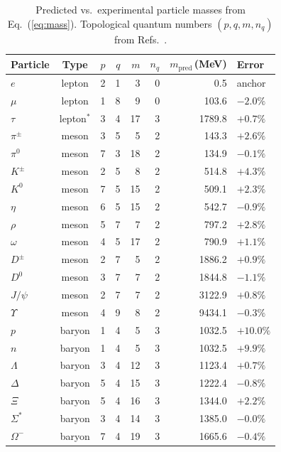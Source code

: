 \documentclass[11pt]{article}
\begin{document}
\begin{table}[t]
\centering
\caption{Predicted vs.\ experimental particle masses from Eq.~(\ref{eq:mass}).
Topological quantum numbers $(p,q,m,n_q)$ from Refs.~\cite{NWT1,NWT6}.}
\label{tab:spectrum}
\smallskip
\begin{tabular}{lcrrrrrl}
\toprule
Particle & Type & $p$ & $q$ & $m$ & $n_q$
    & $m_\mathrm{pred}$\,(MeV) & Error \\
\midrule
$e$            & lepton & 2 & 1 &  3 & 0 &     0.5 & anchor \\
$\mu$          & lepton & 1 & 8 &  9 & 0 &   103.6 & $-2.0\%$ \\
$\tau$         & lepton$^*$ & 3 & 4 & 17 & 3 &  1789.8 & $+0.7\%$ \\
\midrule
$\pi^{\pm}$    & meson  & 3 & 5 &  5 & 2 &   143.3 & $+2.6\%$ \\
$\pi^0$        & meson  & 7 & 3 & 18 & 2 &   134.9 & $-0.1\%$ \\
$K^{\pm}$      & meson  & 2 & 5 &  8 & 2 &   514.8 & $+4.3\%$ \\
$K^0$          & meson  & 7 & 5 & 15 & 2 &   509.1 & $+2.3\%$ \\
$\eta$         & meson  & 6 & 5 & 15 & 2 &   542.7 & $-0.9\%$ \\
$\rho$         & meson  & 5 & 7 &  7 & 2 &   797.2 & $+2.8\%$ \\
$\omega$       & meson  & 4 & 5 & 17 & 2 &   790.9 & $+1.1\%$ \\
$D^{\pm}$      & meson  & 2 & 7 &  5 & 2 &  1886.2 & $+0.9\%$ \\
$D^0$          & meson  & 3 & 7 &  7 & 2 &  1844.8 & $-1.1\%$ \\
$J/\psi$       & meson  & 2 & 7 &  7 & 2 &  3122.9 & $+0.8\%$ \\
$\Upsilon$     & meson  & 4 & 9 &  8 & 2 &  9434.1 & $-0.3\%$ \\
\midrule
$p$            & baryon & 1 & 4 &  5 & 3 &  1032.5 & $+10.0\%$ \\
$n$            & baryon & 1 & 4 &  5 & 3 &  1032.5 & $+9.9\%$ \\
$\Lambda$      & baryon & 3 & 4 & 12 & 3 &  1123.4 & $+0.7\%$ \\
$\Delta$       & baryon & 5 & 4 & 15 & 3 &  1222.4 & $-0.8\%$ \\
$\Xi$          & baryon & 5 & 4 & 16 & 3 &  1344.0 & $+2.2\%$ \\
$\Sigma^*$     & baryon & 3 & 4 & 14 & 3 &  1385.0 & $-0.0\%$ \\
$\Omega^-$     & baryon & 7 & 4 & 19 & 3 &  1665.6 & $-0.4\%$ \\

\end{tabular}
\end{table}
\end{document}
